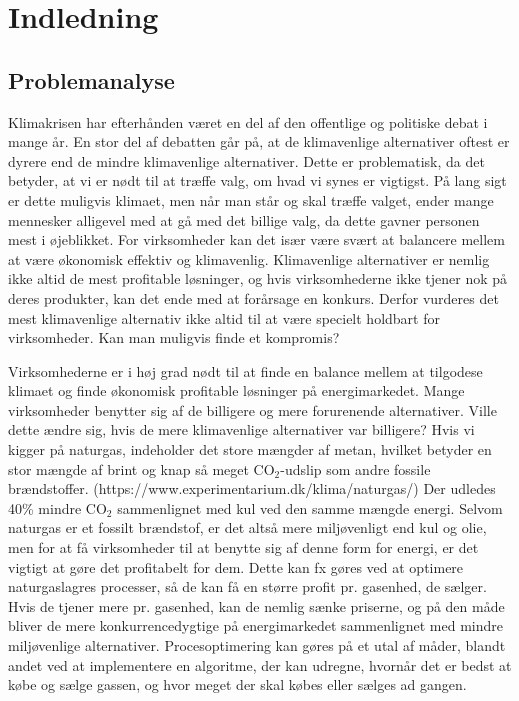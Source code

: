 \chapter{Indledning}
\section{Problemanalyse}
Klimakrisen har efterhånden været en del af den offentlige og politiske debat i mange år. En stor del af debatten går på, at de klimavenlige alternativer oftest er dyrere end de mindre klimavenlige alternativer. Dette er problematisk, da det betyder, at vi er nødt til at træffe valg, om hvad vi synes er vigtigst. På lang sigt er dette muligvis klimaet, men når man står og skal træffe valget, ender mange mennesker alligevel med at gå med det billige valg, da dette gavner personen mest i øjeblikket.
For virksomheder kan det især være svært at balancere mellem at være økonomisk effektiv og klimavenlig. Klimavenlige alternativer er nemlig ikke altid de mest profitable løsninger, og hvis virksomhederne ikke tjener nok på deres produkter, kan det ende med at forårsage en konkurs. Derfor vurderes det mest klimavenlige alternativ ikke altid til at være specielt holdbart for virksomheder. Kan man muligvis finde et kompromis? 

Virksomhederne er i høj grad nødt til at finde en balance mellem at tilgodese klimaet og finde økonomisk profitable løsninger på energimarkedet. Mange virksomheder benytter sig af de billigere og mere forurenende alternativer. Ville dette ændre sig, hvis de mere klimavenlige alternativer var billigere?
Hvis vi kigger på naturgas, indeholder det store mængder af metan, hvilket betyder en stor mængde af brint og knap så meget $\textrm{CO}_2$-udslip som andre fossile brændstoffer. (https://www.experimentarium.dk/klima/naturgas/) Der udledes 40\% mindre CO$_{2}$ sammenlignet med kul ved den samme mængde energi. Selvom naturgas er et fossilt brændstof, er det altså mere miljøvenligt end kul og olie, men for at få virksomheder til at benytte sig af denne form for energi, er det vigtigt at gøre det profitabelt for dem. Dette kan fx gøres ved at optimere naturgaslagres processer, så de kan få en større profit pr. gasenhed, de sælger. Hvis de tjener mere pr. gasenhed, kan de nemlig sænke priserne, og på den måde bliver de mere konkurrencedygtige på energimarkedet sammenlignet med mindre miljøvenlige alternativer.
Procesoptimering kan gøres på et utal af måder, blandt andet ved at implementere en algoritme, der kan udregne, hvornår det er bedst at købe og sælge gassen, og hvor meget der skal købes eller sælges ad gangen. 

